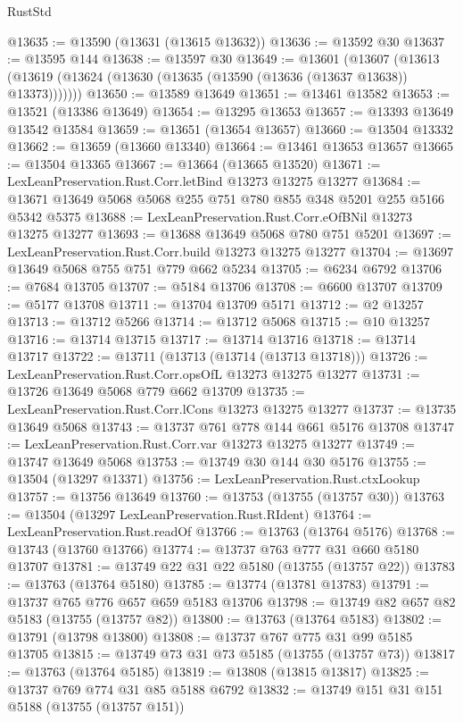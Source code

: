 \begin{lexlean}{RustStd}
\begin{coremodule}
@13635 := @13590 (@13631 (@13615 @13632))
@13636 := @13592 @30
@13637 := @13595 @144
@13638 := @13597 @30
@13649 := @13601
    (@13607 (@13613 (@13619 (@13624 (@13630 (@13635 (@13590 (@13636 (@13637 @13638)) @13373)))))))
@13650 := @13589 @13649
@13651 := @13461 @13582
@13653 := @13521 (@13386 @13649)
@13654 := @13295 @13653
@13657 := @13393 @13649 @13542 @13584
@13659 := @13651 (@13654 @13657)
@13660 := @13504 @13332
@13662 := @13659 (@13660 @13340)
@13664 := @13461 @13653 @13657
@13665 := @13504 @13365
@13667 := @13664 (@13665 @13520)
@13671 := LexLeanPreservation.Rust.Corr.letBind @13273 @13275 @13277
@13684 := @13671 @13649 @5068 @5068 @255 @751 @780 @855 @348 @5201 @255 @5166 @5342 @5375
@13688 := LexLeanPreservation.Rust.Corr.eOfBNil @13273 @13275 @13277
@13693 := @13688 @13649 @5068 @780 @751 @5201
@13697 := LexLeanPreservation.Rust.Corr.build @13273 @13275 @13277
@13704 := @13697 @13649 @5068 @755 @751 @779 @662 @5234
@13705 := @6234 @6792
@13706 := @7684 @13705
@13707 := @5184 @13706
@13708 := @6600 @13707
@13709 := @5177 @13708
@13711 := @13704 @13709 @5171
@13712 := @2 @13257
@13713 := @13712 @5266
@13714 := @13712 @5068
@13715 := @10 @13257
@13716 := @13714 @13715
@13717 := @13714 @13716
@13718 := @13714 @13717
@13722 := @13711 (@13713 (@13714 (@13713 @13718)))
@13726 := LexLeanPreservation.Rust.Corr.opsOfL @13273 @13275 @13277
@13731 := @13726 @13649 @5068 @779 @662 @13709
@13735 := LexLeanPreservation.Rust.Corr.lCons @13273 @13275 @13277
@13737 := @13735 @13649 @5068
@13743 := @13737 @761 @778 @144 @661 @5176 @13708
@13747 := LexLeanPreservation.Rust.Corr.var @13273 @13275 @13277
@13749 := @13747 @13649 @5068
@13753 := @13749 @30 @144 @30 @5176
@13755 := @13504 (@13297 @13371)
@13756 := LexLeanPreservation.Rust.ctxLookup
@13757 := @13756 @13649
@13760 := @13753 (@13755 (@13757 @30))
@13763 := @13504 (@13297 LexLeanPreservation.Rust.RIdent)
@13764 := LexLeanPreservation.Rust.readOf
@13766 := @13763 (@13764 @5176)
@13768 := @13743 (@13760 @13766)
@13774 := @13737 @763 @777 @31 @660 @5180 @13707
@13781 := @13749 @22 @31 @22 @5180 (@13755 (@13757 @22))
@13783 := @13763 (@13764 @5180)
@13785 := @13774 (@13781 @13783)
@13791 := @13737 @765 @776 @657 @659 @5183 @13706
@13798 := @13749 @82 @657 @82 @5183 (@13755 (@13757 @82))
@13800 := @13763 (@13764 @5183)
@13802 := @13791 (@13798 @13800)
@13808 := @13737 @767 @775 @31 @99 @5185 @13705
@13815 := @13749 @73 @31 @73 @5185 (@13755 (@13757 @73))
@13817 := @13763 (@13764 @5185)
@13819 := @13808 (@13815 @13817)
@13825 := @13737 @769 @774 @31 @85 @5188 @6792
@13832 := @13749 @151 @31 @151 @5188 (@13755 (@13757 @151))

\end{coremodule}
\end{lexlean}

